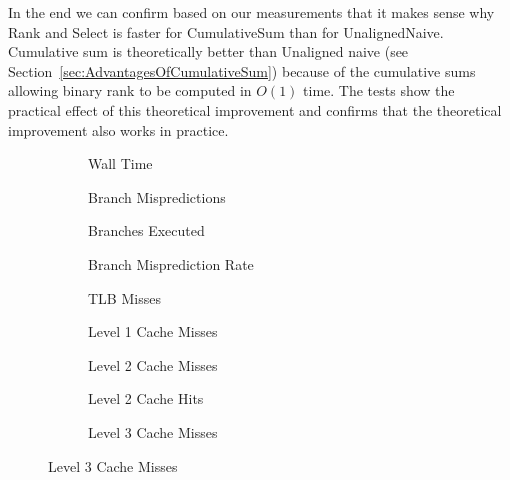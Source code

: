 In the end we can confirm based on our measurements that it makes sense why Rank and Select is faster for CumulativeSum than for UnalignedNaive.
Cumulative sum is theoretically better than Unaligned naive (see Section~\ref{sec:AdvantagesOfCumulativeSum}) because of the cumulative sums allowing binary rank to be computed in $O(1)$ time.
The tests show the practical effect of this theoretical improvement and confirms that the theoretical improvement also works in practice.



\begin{figure}\tiny

\begin{subfigure}{0.30\textwidth}
	
	\caption{Wall Time}
	\label{fig:CumulativeSumRankWalltime}
\end{subfigure}
\hfill
\begin{subfigure}{0.30\textwidth}
	
	\caption{Branch Mispredictions}
	\label{fig:CumulativeSumRankBranchMiss}
\end{subfigure}
\hfill
\begin{subfigure}{0.30\textwidth}
	
	\caption{Branches Executed}
	\label{fig:CumulativeSumRankBranchExe}
\end{subfigure}


\begin{subfigure}{0.30\textwidth}
	
	\caption{Branch Misprediction Rate}
	\label{fig:CumulativeSumRankBranchMissRate}
\end{subfigure}
\hfill
\begin{subfigure}{0.30\textwidth}
	
	\caption{TLB Misses}
	\label{fig:CumulativeSumRankTLBMiss}
\end{subfigure}
\hfill
\begin{subfigure}{0.30\textwidth}
	
	\caption{Level 1 Cache Misses}
	\label{fig:CumulativeSumRankL1CM}
\end{subfigure}

\begin{subfigure}{0.30\textwidth}
	
	\caption{Level 2 Cache Misses}
	\label{fig:CumulativeSumRankL2CM}
\end{subfigure}
\hfill
\begin{subfigure}{0.30\textwidth}
	
\caption{Level 2 Cache Hits}
\label{fig:CumulativeSumRankL2CHits}
\end{subfigure}
\hfill
%	
\begin{subfigure}{0.30\textwidth}
	
	\caption{Level 3 Cache Misses}
	\label{fig:CumulativeSumRankL3CM}
\end{subfigure}


\end{figure}
